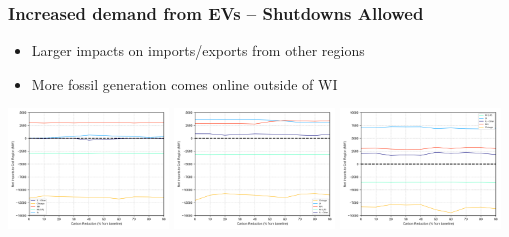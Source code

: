 \documentclass[xcolor=dvipsnames]{beamer}
\begin{document}
\begin{frame}  \frametitle{Increased demand from EVs -- Shutdowns Allowed}
\begin{itemize}
    \item Larger impacts on imports/exports from other regions
    \item More fossil generation comes online outside of WI
\end{itemize}
  \includegraphics[width=0.32\textwidth]{includes/no_leakage_shutdowns_5pct_EVs_agg_exim.png}  \includegraphics[width=0.32\textwidth]{includes/no_leakage_shutdowns_20pct_EVs_agg_exim.png}
  \includegraphics[width=0.32\textwidth]{includes/no_leakage_shutdowns_50pct_EVs_agg_exim.png}
  
  
  
%
%

\end{frame}



%
%
%
\end{document}
